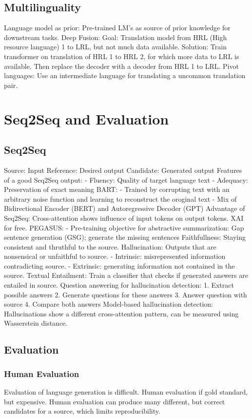 \documentclass{scrartcl}
\begin{document}
\subsection*{Multilinguality}
Language model as prior: Pre-trained LM's as source of prior knowledge for downstream tasks.
Deep Fusion: Goal: Translation model from HRL (High resource language) 1 to LRL, but not much data available. Solution: Train transformer on translation of HRL 1 to HRL 2, for which more data to LRL is available. Then replace the decoder with a decoder from HRL 1 to LRL.
Pivot languages: Use an intermediate language for translating a uncommon translation pair.


\section*{Seq2Seq and Evaluation}
\subsection*{Seq2Seq}
Source: Input
Reference: Desired output
Candidate: Generated output
Features of a good Seq2Seq output:
- Fluency: Quality of target language text
- Adequacy: Preservation of exact meaning
BART:
- Trained by corrupting text with an arbitrary noise function and learning to reconstruct the oroginal text
- Mix of Bidirectional Encoder (BERT) and Autoregressive Decoder (GPT)
Advantage of Seq2Seq: Cross-attention shows influence of input tokens on output tokens. XAI for free.
PEGASUS:
- Pre-training objective for abstractive summarization: Gap sentence generation (GSG); generate the missing sentences
Faithfullness: Staying consistent and thruthful to the source.
Hallucination: Outputs that are nonsensical or unfaithful to source.
- Intrinsic: misrepresented information contradicting source.
- Extrinsic: generating information not contained in the source.
Textual Entailment: Train a classifier that checks if generated answers are entailed in source.
Question answering for hallucination detection:
1. Extract possible answers
2. Generate questions for these answers
3. Answer question with source
4. Compare both answers
Model-based hallucination detection: Hallucinations show a different cross-attention pattern, can be measured using Wasserstein distance.

\subsection*{Evaluation}
\subsubsection*{Human Evaluation}
Evaluation of language generation is difficult.
Human evaluation if gold standard, but expensive. Human evaluation can produce many different, but correct candidates for a source, which limits reproducibility.
\end{document}
